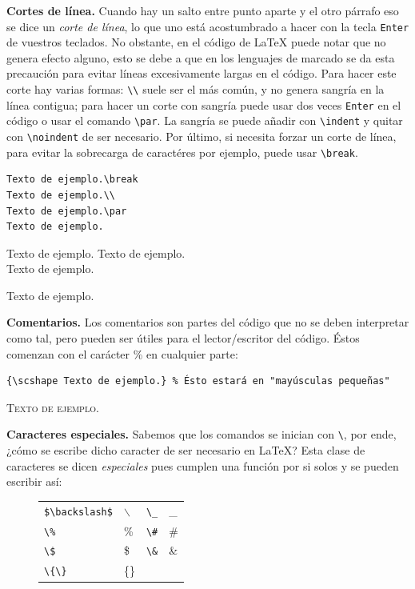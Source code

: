 \textbf{Cortes de línea.}
Cuando hay un salto entre punto aparte y el otro párrafo eso se dice un \textit{corte de línea},
lo que uno está acostumbrado a hacer con la tecla \texttt{Enter} de vuestros teclados.
No obstante, en el código de \LaTeX{} puede notar que no genera efecto alguno,
esto se debe a que en los lenguajes de marcado se da esta precaución para evitar líneas excesivamente largas en el código.
Para hacer este corte hay varias formas:
\lstinline|\\| suele ser el más común, y no genera sangría en la línea contigua;
para hacer un corte con sangría puede usar dos veces \texttt{Enter} en el código o usar el comando \lstinline|\par|.
La sangría se puede añadir con \lstinline|\indent| y quitar con \lstinline|\noindent| de ser necesario.
Por último, si necesita forzar un corte de línea, para evitar la sobrecarga de caractéres por ejemplo, puede usar \lstinline|\break|.
\begin{multicols}{2}
\begin{lstlisting}
Texto de ejemplo.\break
Texto de ejemplo.\\
Texto de ejemplo.\par
Texto de ejemplo.
\end{lstlisting}
Texto de ejemplo.\break
Texto de ejemplo.\\
Texto de ejemplo.\par
Texto de ejemplo.
\end{multicols}

\textbf{Comentarios.}
Los comentarios son partes del código que no se deben interpretar como tal, pero pueden ser útiles para el lector/escritor del código.
Éstos comenzan con el carácter \% en cualquier parte:
\begin{multicols}{2}
\begin{lstlisting}
{\scshape Texto de ejemplo.} % Ésto estará en "mayúsculas pequeñas"
\end{lstlisting}
{\scshape Texto de ejemplo.} %
\end{multicols}

\textbf{Caracteres especiales.}
Sabemos que los comandos se inician con \lstinline|\|, por ende, ¿cómo se escribe dicho caracter de ser necesario en \LaTeX{}?
Esta clase de caracteres se dicen \textit{especiales} pues cumplen una función por si solos y se pueden escribir así:
\begin{figure}[!h]
	\centering
	\begin{tabular}{ll|ll}
		\hline \hline
		\lstinline|$\backslash$| & $\backslash$ & \lstinline|\_|           & \_ \\
		\lstinline|\%|           & \%           & \lstinline|\#|           & \# \\
		\lstinline|\$|           & \$           & \lstinline|\&|           & \& \\
		\lstinline|\{\}|         & \{\} \\
		\hline \hline
	\end{tabular}
\end{figure}

